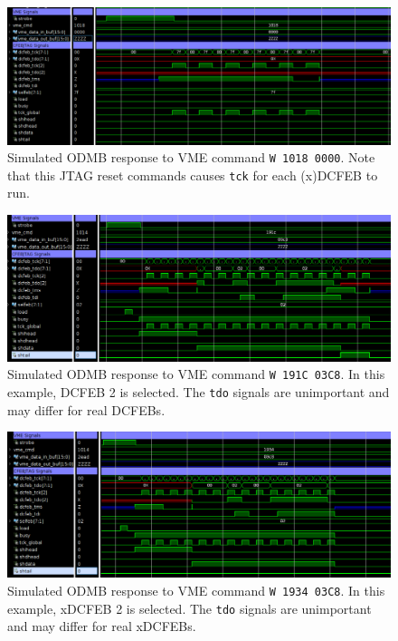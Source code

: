 \documentclass[10pt,a4paper]{article}
\begin{document}
\begin{figure}[H]
\centering
\includegraphics[width= 1.0 \textwidth]{figures/cfebjtag_1018.png}
\caption{Simulated ODMB response to VME command \texttt{W 1018 0000}. Note that this JTAG reset commands causes \texttt{tck} for each (x)DCFEB to run.}
\label{fig:jtag1018}
\end{figure}

\begin{figure}[H]
\centering
\includegraphics[width= 1.0 \textwidth]{figures/cfebjtag_191c.png}
\caption{Simulated ODMB response to VME command \texttt{W 191C 03C8}. In this example, DCFEB 2 is selected. The \texttt{tdo} signals are unimportant and may differ for real DCFEBs.}
\label{fig:jtag191c}
\end{figure}

\begin{figure}[H]
\centering
\includegraphics[width= 1.0 \textwidth]{figures/cfebjtag_1934.png}
\caption{Simulated ODMB response to VME command \texttt{W 1934 03C8}. In this example, xDCFEB 2 is selected. The \texttt{tdo} signals are unimportant and may differ for real xDCFEBs.}
\label{fig:jtag1934}
\end{figure}
\end{document}

